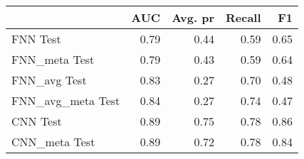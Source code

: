 \begin{tabular}{lrrrr}
\toprule
{} &   AUC &  Avg. pr &  Recall &    F1 \\
\midrule
FNN Test          &  0.79 &     0.44 &    0.59 &  0.65 \\
FNN\_meta Test     &  0.79 &     0.43 &    0.59 &  0.64 \\
FNN\_avg Test      &  0.83 &     0.27 &    0.70 &  0.48 \\
FNN\_avg\_meta Test &  0.84 &     0.27 &    0.74 &  0.47 \\
CNN Test          &  0.89 &     0.75 &    0.78 &  0.86 \\
CNN\_meta Test     &  0.89 &     0.72 &    0.78 &  0.84 \\
\bottomrule
\end{tabular}
